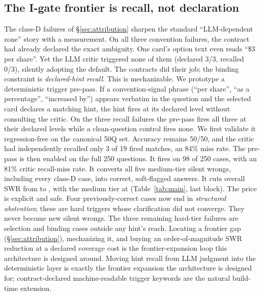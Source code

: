 \subsection{The I-gate frontier is recall, not declaration}\label{sec:recall}
The class-D failures of \S\ref{sec:attribution} sharpen the standard ``LLM-dependent zone'' story with a measurement.
On all three convention failures, the contract had already declared the exact ambiguity.
One card's option text even reads ``\$3 per share''.
Yet the LLM critic triggered none of them (declared 3/3, recalled 0/3), silently adopting the default.
The contracts did their job; the binding constraint is \emph{declared-hint recall}.
This is mechanizable.
We prototype a deterministic trigger pre-pass.
If a convention-signal phrase (``per share'', ``as a percentage'', ``increased by'') appears verbatim in the question and the selected card declares a matching hint, the hint fires at its declared level without consulting the critic.
On the three recall failures the pre-pass fires all three at their declared levels while a clean-question control fires none.
We first validate it regression-free on the canonical 50Q set.
Accuracy remains 50/50, and the critic had independently recalled only 3 of 19 fired matches, an 84\% miss rate.
The pre-pass is then enabled on the full 250 questions.
It fires on 98 of 250 cases, with an 81\% critic recall-miss rate.
It converts all five medium-tier silent wrongs, including every class-D case, into correct, soft-flagged answers.
It cuts overall SWR from \vqSWRAll{} to \textbf{\vqtSWRAll{}}, with the medium tier at \textbf{\vqtSWRMed{}} (Table~\ref{tab:main}, last block).
The price is explicit and safe.
Four previously-correct cases now end in \emph{structured abstention}; these are hard triggers whose clarification did not converge.
They never become new silent wrongs.
The three remaining hard-tier failures are selection and binding cases outside any hint's reach.
Locating a frontier gap (\S\ref{sec:attribution}), mechanizing it, and buying an order-of-magnitude SWR reduction at a declared coverage cost is the frontier-expansion loop this architecture is designed around.
Moving hint recall from LLM judgment into the deterministic layer is exactly the frontier expansion the architecture is designed for; contract-declared machine-readable trigger keywords are the natural build-time extension.

